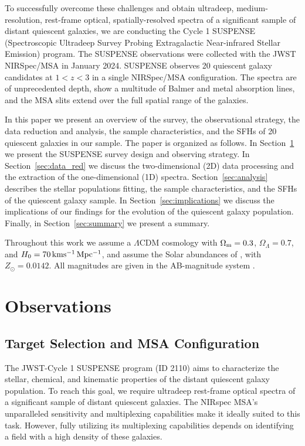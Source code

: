 \documentclass[twocolumn, astrosymb]{aastex631}
\begin{document}
To successfully overcome these challenges and obtain ultradeep, medium-resolution, rest-frame optical, spatially-resolved spectra of a significant sample of distant quiescent galaxies, we are conducting the Cycle 1 SUSPENSE (Spectroscopic Ultradeep Survey Probing Extragalactic Near-infrared Stellar Emission) program. The SUSPENSE observations were collected with the JWST NIRSpec/MSA in January 2024. SUSPENSE observes 20 quiescent galaxy candidates at $1<z<3$ in a single NIRSpec/MSA configuration. The spectra are of unprecedented depth, show a multitude of Balmer and metal absorption lines, and the MSA slits extend over the full spatial range of the galaxies. 

In this paper we present an overview of the survey, the observational strategy, the data reduction and analysis, the sample characteristics, and the SFHs of 20 quiescent galaxies in our sample. The paper is organized as follows. In Section~\ref{sec:obs} we present the SUSPENSE survey design and observing strategy. In Section~\ref{sec:data_red} we discuss the two-dimensional (2D) data processing and the extraction of the one-dimensional (1D) spectra. Section~\ref{sec:analysis} describes the stellar populations fitting, the sample characteristics, and the SFHs of the quiescent galaxy sample. In Section~\ref{sec:implications} we discuss the implications of our findings for the evolution of the quiescent galaxy population. Finally, in Section~\ref{sec:summary} we present a summary.

Throughout this work we assume a $\Lambda$CDM cosmology with $\Omega_{\rm m}= 0.3$, $\Omega_\Lambda=0.7$, and $H_0 =70\rm \, km s^{-1} \,Mpc^{-1}$, and assume the Solar abundances of \citet{MAsplund2009}, with $Z_{\odot}=0.0142$. All magnitudes are given in the AB-magnitude system \citep{JOke1983}. 

\section{Observations}\label{sec:obs}
\subsection{Target Selection and MSA Configuration}\label{sec:survey}

The JWST-Cycle 1 SUSPENSE program (ID 2110) aims to characterize the stellar, chemical, and kinematic properties of the distant quiescent galaxy population. To reach this goal, we require ultradeep rest-frame optical spectra of a significant sample of distant quiescent galaxies. The NIRspec MSA's unparalleled sensitivity and multiplexing capabilities make it ideally suited to this task. However, fully utilizing its multiplexing capabilities depends on identifying a field with a high density of these galaxies.
\end{document}
